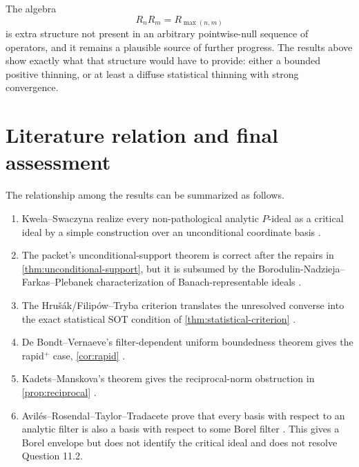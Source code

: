 \documentclass[11pt]{article}
\theoremstyle{definition}
\theoremstyle{remark}
\begin{document}
The algebra
\[
 R_nR_m=R_{\max(n,m)}
\]
is extra structure not present in an arbitrary pointwise-null sequence of
operators, and it remains a plausible source of further progress.  The
results above show exactly what that structure would have to provide: either a
bounded positive thinning, or at least a diffuse statistical thinning with
strong convergence.

\section{Literature relation and final assessment}

The relationship among the results can be summarized as follows.

\begin{enumerate}[label=\arabic*.]
 \item Kwela--Swaczyna realize every non-pathological analytic $P$-ideal as a
 critical ideal by a simple construction over an unconditional coordinate
 basis \cite[Theorem 7.1]{KS}.

 \item The packet's unconditional-support theorem is correct after the repairs
 in \cref{thm:unconditional-support}, but it is subsumed by the
 Borodulin-Nadzieja--Farkas--Plebanek characterization of Banach-representable
 ideals \cite{BNFP}.

 \item The Hru\v{s}\'ak/Filip\'ow--Tryba criterion translates the unresolved
 converse into the exact statistical SOT condition of
 \cref{thm:statistical-criterion} \cite{FilipowTryba}.

 \item De Bondt--Vernaeve's filter-dependent uniform boundedness theorem gives
 the rapid$^+$ case, \cref{cor:rapid} \cite{DeBondtVernaeve}.

 \item Kadets--Manskova's theorem gives the reciprocal-norm obstruction in
 \cref{prop:reciprocal} \cite{KadetsManskova}.

 \item Avil\'es--Rosendal--Taylor--Tradacete prove that every basis with
 respect to an analytic filter is also a basis with respect to some Borel
 filter \cite{ARTT}.  This gives a Borel envelope but does not identify the
 critical ideal and does not resolve Question 11.2.
\end{enumerate}
\end{document}
